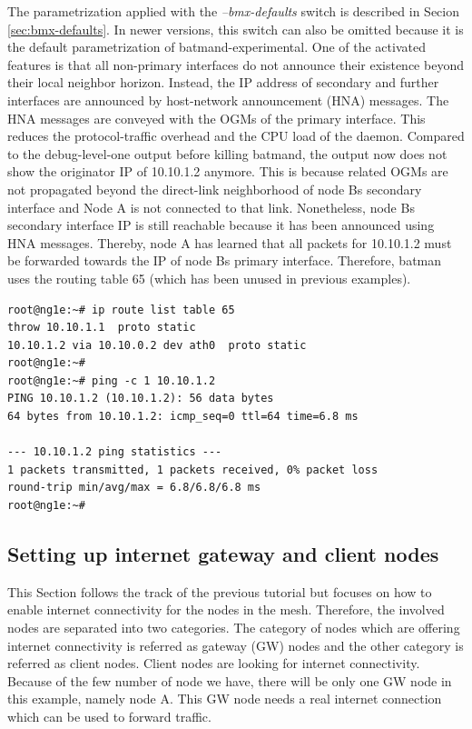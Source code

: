 \documentclass[11pt]{article}
\begin{document}
\begin{enumerate}
The parametrization applied with the \emph{--bmx-defaults} switch is described in Secion \ref{sec:bmx-defaults}. In newer versions, this switch can also be omitted because it is the default parametrization of batmand-experimental.
One of the activated features is that all non-primary interfaces do not announce their existence beyond their local neighbor horizon. 
Instead, the IP address of secondary and further interfaces are announced by host-network announcement (HNA) messages. 
The HNA messages are conveyed with the OGMs of the primary interface. 
This reduces the protocol-traffic overhead and the CPU load of the daemon.
%
Compared to the debug-level-one output before killing batmand, the output now does not show the originator IP of 10.10.1.2 anymore. This is because related OGMs are not propagated beyond the direct-link neighborhood of node Bs secondary interface and Node A is not connected to that link. Nonetheless, node Bs secondary interface IP is still reachable because it has been announced using HNA messages. Thereby, node A has learned that all packets for 10.10.1.2 must be forwarded towards the IP of node Bs primary interface.
%
Therefore, batman uses the routing table 65 (which has been unused in previous examples).

\begin{small} \begin{verbatim}
root@ng1e:~# ip route list table 65
throw 10.10.1.1  proto static
10.10.1.2 via 10.10.0.2 dev ath0  proto static
root@ng1e:~# 
root@ng1e:~# ping -c 1 10.10.1.2
PING 10.10.1.2 (10.10.1.2): 56 data bytes
64 bytes from 10.10.1.2: icmp_seq=0 ttl=64 time=6.8 ms

--- 10.10.1.2 ping statistics ---
1 packets transmitted, 1 packets received, 0% packet loss
round-trip min/avg/max = 6.8/6.8/6.8 ms
root@ng1e:~# 
\end{verbatim} \end{small}


\end{enumerate}


\subsection{Setting up internet gateway and client nodes}
\label{sec:howto-gw}

This Section follows the track of the previous tutorial but focuses on how to enable internet connectivity for the nodes in the mesh. 
Therefore, the involved nodes are separated into two categories. 
The category of nodes which are offering internet connectivity is referred as gateway (GW) nodes and the other category is referred as client nodes. 
Client nodes are looking for internet connectivity. 
Because of the few number of node we have, there will be only one GW node in this example, namely node A. 
This GW node needs a real internet connection which can be used to forward traffic. 
\end{document}
